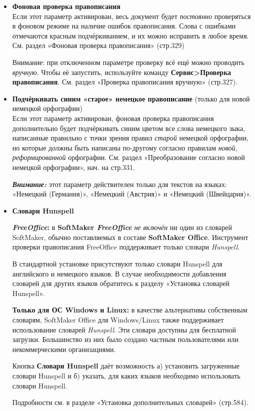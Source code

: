 ﻿\documentclass[a4paper,10pt]{article}
\begin{document}
 \begin{itemize}
  \item \textbf{Фоновая проверка правописания}\\
  Если этот параметр активирован, весь документ будет \textit{постоянно} проверяться в фоновом режиме на наличие ошибок правописания. Слова с ошибками отмечаются красным подчёркиванием, и их можно исправить в любое время. См. раздел «Фоновая проверка правописания» (стр.329)
  
  Внимание: при отключенном параметре проверку всё ещё можно проводить \textit{вручную}. Чтобы её запустить, используйте команду \textbf{Сервис>Проверка правописания}. См. раздел «Проверка правописания вручную» (стр.327).
  \item \textbf{Подчёркивать синим «старое» немецкое правописание} (только для новой немецкой орфографии)\\
  Если этот параметр активирован, фоновая проверка правописания дополнительно будет подчёркивать синим цветом все слова немецкого зыка, написанные правильно с точки зрения правил \textit{старой} немецкой орфографии, но которые должны быть написаны по-другому согласно правилам \textit{новой, реформированной} орфографии. См. раздел «Преобразование согласно новой немецкой орфографии», нач. на стр.331.
  
  \begin{mdframed}[backgroundcolor=blue!10]
\textbf{\textit{Внимание:}} этот параметр действителен только для текстов на языках: «Немецкий (Германия)»,  «Немецкий (Австрия)» и «Немецкий (Швейцария)».
\end{mdframed}
\item \textbf{Словари Hunspell}\\
\begin{mdframed}[backgroundcolor=pink!50]
\textbf{\textit{FreeOffice}:} в \textbf{SoftMaker \textit{FreeOffice}} \textit{не включён} ни один из словарей SoftMaker, обычно поставляемых в составе \textbf{SoftMaker Office}. Инструмент проверки правописания FreeOffice поддерживает только словари \textit{Hunspell}.

В стандартной установке присутствуют только словари Hunspell для английского и немецкого языков. В случае необходимости добавления словарей для других языков обратитесь к разделу «Установка словарей Hunspell».
\end{mdframed}

\textbf{Только для ОС Windows и Linux:} в качестве альтернативы собственным словарям, SoftMaker Office для Windows/Linux также поддерживает использование словарей \textit{Hunspell}. Эти словари доступны для бесплатной загрузки. Большинство из них было создано частным пользователями или некоммерческими организациями.

Кнопка \textbf{Словари Hunspell} даёт возможность а) установить загруженные словари Hunspell и б) указать, для каких языков необходимо использовать словари Hunspell.

Подробности см. в разделе «Установка дополнительных словарей» (стр.584).
 \end{itemize}
\end{document}

